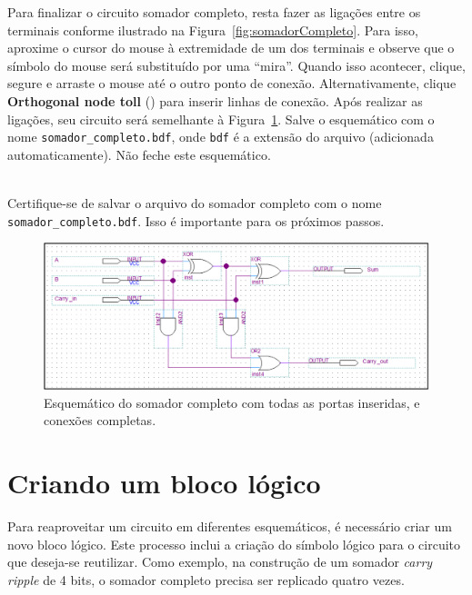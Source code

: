 \documentclass[12pt,a4paper]{article}
\newcommand{\Atention}[1]{
    \begin{tcolorbox}[colback=red!5!white,colframe=red!75!black]
    \begin{center}
    \faExclamationTriangle{}\\#1
    \end{center}
    \end{tcolorbox}
}
\begin{document}
Para finalizar o circuito somador completo, resta fazer as ligações entre os terminais conforme ilustrado na Figura~\ref{fig:somadorCompleto}. Para isso, aproxime o cursor do mouse à extremidade de um dos terminais e observe que o símbolo do mouse será substituído por uma ``mira''. Quando isso acontecer, clique, segure e arraste o mouse até o outro ponto de conexão. Alternativamente, clique \textbf{Orthogonal node toll} () para inserir linhas de conexão. Após realizar as ligações, seu circuito será semelhante à Figura~\ref{fig:somadorFeito}. Salve o esquemático com o nome \texttt{somador\_completo.bdf}, onde \texttt{bdf} é a extensão do arquivo (adicionada automaticamente). Não feche este esquemático.

\Atention{Certifique-se de salvar o arquivo do somador completo com o nome \texttt{somador\_completo.bdf}. Isso é importante para os próximos passos.}

\begin{figure}[htbp!]
    \centering
    \includegraphics[width=\textwidth]{./figs/somadorFeito.png}
    \caption{Esquemático do somador completo com todas as portas inseridas, e conexões completas.}
    \label{fig:somadorFeito}
\end{figure}

\section{Criando um bloco lógico}

Para reaproveitar um circuito em diferentes esquemáticos, é necessário criar um novo bloco lógico. Este processo inclui a criação do símbolo lógico para o circuito que deseja-se reutilizar. Como exemplo, na construção de um somador \textit{carry ripple} de 4 bits, o somador completo precisa ser replicado quatro vezes.
\end{document}
